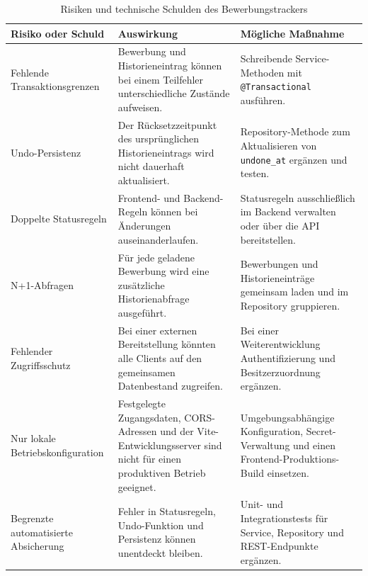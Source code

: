 \documentclass[a4paper,11pt]{article}
\renewcommand{\arraystretch}{1.25}
\begin{document}
\vspace{0.3cm}

\begin{table}[H]
\centering
\small
\renewcommand{\arraystretch}{1.2}
\begin{tabularx}{\textwidth}{L{3.5cm} Y Y}
\toprule
\textbf{Risiko oder Schuld} & \textbf{Auswirkung} & \textbf{Mögliche Maßnahme} \\
\midrule

Fehlende Transaktionsgrenzen &
Bewerbung und Historieneintrag können bei einem Teilfehler unterschiedliche Zustände aufweisen. &
Schreibende Service-Methoden mit \texttt{@Transactional} ausführen. \\

\addlinespace[0.15cm]

Undo-Persistenz &
Der Rücksetzzeitpunkt des ursprünglichen Historieneintrags wird nicht dauerhaft aktualisiert. &
Repository-Methode zum Aktualisieren von \texttt{undone\_at} ergänzen und testen. \\

\addlinespace[0.15cm]

Doppelte Statusregeln &
Frontend- und Backend-Regeln können bei Änderungen auseinanderlaufen. &
Statusregeln ausschließlich im Backend verwalten oder über die API bereitstellen. \\

\addlinespace[0.15cm]

N+1-Abfragen &
Für jede geladene Bewerbung wird eine zusätzliche Historienabfrage ausgeführt. &
Bewerbungen und Historieneinträge gemeinsam laden und im Repository gruppieren. \\

\addlinespace[0.15cm]

Fehlender Zugriffsschutz &
Bei einer externen Bereitstellung könnten alle Clients auf den gemeinsamen Datenbestand zugreifen. &
Bei einer Weiterentwicklung Authentifizierung und Besitzerzuordnung ergänzen. \\

\addlinespace[0.15cm]

Nur lokale Betriebskonfiguration &
Festgelegte Zugangsdaten, CORS-Adressen und der Vite-Entwicklungsserver sind nicht für einen produktiven Betrieb geeignet. &
Umgebungsabhängige Konfiguration, Secret-Verwaltung und einen Frontend-Produktions-Build einsetzen. \\

\addlinespace[0.15cm]

Begrenzte automatisierte Absicherung &
Fehler in Statusregeln, Undo-Funktion und Persistenz können unentdeckt bleiben. &
Unit- und Integrationstests für Service, Repository und REST-Endpunkte ergänzen. \\

\bottomrule
\end{tabularx}
\caption{Risiken und technische Schulden des Bewerbungstrackers}
\label{tab:risks}
\end{table}
\end{document}
